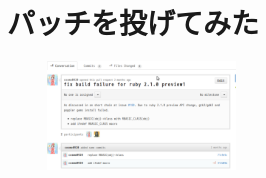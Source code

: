 \section{パッチを投げてみた}

\begin{figure}[h]
\begin{center}
  \includegraphics[width=5cm]{img/pull181.pdf}
\end{center}
\end{figure}
